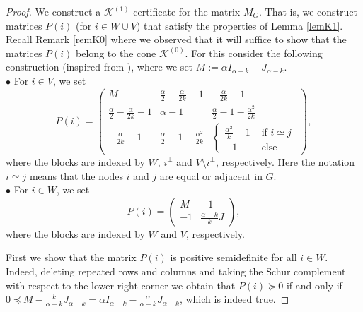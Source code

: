 \documentclass[11pt]{article}
\numberwithin{equation}{section}
\begin{document}
\begin{proof}
We construct a $\mathcal K^{(1)}$-certificate for the matrix $M_G$. That is, we  construct matrices  $P(i)$ (for $i\in W\cup V$) that satisfy the properties of Lemma \ref{lemK1}. Recall  Remark \ref{remK0} where we observed that it will suffice to show that the matrices $P(i)$ belong to the cone $\mathcal K^{(0)}$.
For this consider the following construction (inspired from \cite{GL2007}), where we set $M:=\alpha I_{\alpha-k}-J_{\alpha-k}$.
\\
$\bullet$ 
For $i\in V$, we set
    $$
P(i)=
\left(
\begin{array}{c|c|c}
M & \frac{\alpha}{2}-\frac{\alpha}{2k}-1 & -\frac{\alpha}{2k}-1 \\
\hline
\frac{\alpha}{2}-\frac{\alpha}{2k}-1 &  \alpha-1 &
      \frac{\alpha}{2}-1-\frac{\alpha^2}{2k} \\
      \hline
    -\frac{\alpha}{2k}-1 & \frac{\alpha}{2}-1-\frac{\alpha^2}{2k} &
    \left\{ \begin{array}{ll}
      \frac{\alpha^2}{k}-1 & \text{ if }i\simeq j \\
      -1 & \text{ else}
      \end{array} \right.
\end{array}
\right),
$$
where the blocks are indexed by $W$, $i^\perp$ and  $V \setminus i^\perp$, respectively. Here the notation $i\simeq j$ means that the nodes $i$ and $j$ are equal or adjacent in $G$.
\\
$\bullet$ For $i\in W$, we set
$$
   P(i)=\left( \begin{array}{c|c}
M & -1\\
\hline
-1 &  \frac{\alpha-k}{k}J 
\end{array} \right),
$$
where the blocks are indexed by $W$ and $V$, respectively. 

First we show that the matrix $P(i)$ is positive semidefinite for all $i\in  W$.  Indeed, deleting repeated rows and columns and taking the Schur complement with respect to the lower right corner we obtain that $P(i)\succeq 0$ if and only if $0\preceq M -\frac{k}{\alpha-k}J_{\alpha-k}=\alpha I_{\alpha-k}-\frac{\alpha}{\alpha-k}J_{\alpha-k}$,  which is indeed true.


\end{proof}
\end{document}
